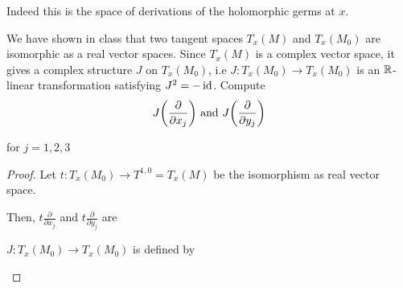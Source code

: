 \documentclass{article}
\begin{document}
Indeed this is the space of derivations of the holomorphic germs at $x$.

We have shown in class that two tangent spaces $T_x(M)$ and $T_x(M_0)$ are isomorphic as a real vector spaces. Since $T_x(M)$ is a complex vector space, it gives a complex structure $J$ on $T_x(M_0)$, i.e $J: T_x(M_0) \to T_x(M_0)$ is an $\mathbb{R}$-linear transformation satisfying $J^2 = -\operatorname{id}$. Compute
$$
    J\tuple*{\frac{\partial}{\partial x_j}} \text{ and } J\tuple*{\frac{\partial}{\partial y_j}}
$$

for $j=1,2,3$

\begin{proof}
Let $t: T_x(M_0) \to T^{1,0} = T_x(M)$ be the isomorphism as real vector space.

\begin{center}
\end{center}

Then, $t \frac{\partial}{\partial x_j}$ and $t \frac{\partial}{\partial y_j}$ are

\begin{center}
\end{center}

$J: T_x(M_0) \to T_x(M_0)$ is defined by

\begin{center}
\end{center}


\end{proof}
\end{document}
